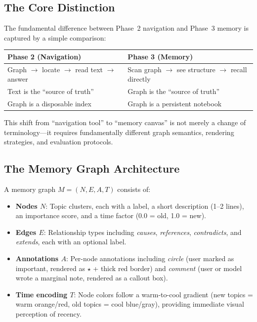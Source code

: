 \documentclass[11pt,a4paper]{article}
\begin{document}
\subsection{The Core Distinction}

The fundamental difference between Phase~2 navigation and Phase~3 memory is captured by a simple comparison:

\begin{center}\footnotesize
\begin{tabular}{ll}
\toprule
\textbf{Phase 2 (Navigation)} & \textbf{Phase 3 (Memory)} \\
\midrule
Graph $\rightarrow$ locate $\rightarrow$ read text $\rightarrow$ answer
& Scan graph $\rightarrow$ see structure $\rightarrow$ recall directly \\
Text is the ``source of truth'' & Graph is the ``source of truth'' \\
Graph is a disposable index & Graph is a persistent notebook \\
\bottomrule
\end{tabular}
\end{center}

This shift from ``navigation tool'' to ``memory canvas'' is not merely a change of terminology---it requires fundamentally different graph semantics, rendering strategies, and evaluation protocols.

\subsection{The Memory Graph Architecture}

A memory graph $M = (N, E, A, T)$ consists of:

\begin{itemize}[nosep]
\item \textbf{Nodes $N$}: Topic clusters, each with a label, a short description (1--2 lines), an importance score, and a time factor (0.0 = old, 1.0 = new).
\item \textbf{Edges $E$}: Relationship types including \textit{causes}, \textit{references}, \textit{contradicts}, and \textit{extends}, each with an optional label.
\item \textbf{Annotations $A$}: Per-node annotations including \textit{circle} (user marked as important, rendered as $\star$ + thick red border) and \textit{comment} (user or model wrote a marginal note, rendered as a callout box).
\item \textbf{Time encoding $T$}: Node colors follow a warm-to-cool gradient (new topics = warm orange/red, old topics = cool blue/gray), providing immediate visual perception of recency.
\end{itemize}
\end{document}
